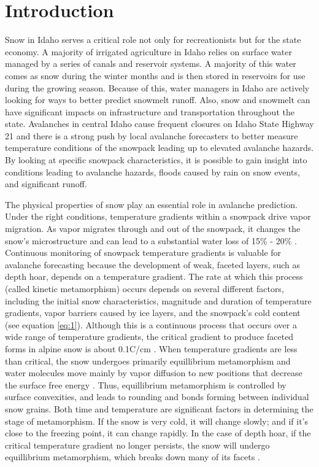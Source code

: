 \chapter{Introduction}
Snow in Idaho serves a critical role not only for recreationists but for the state economy. A majority of irrigated agriculture in Idaho relies on surface water managed by a series of canals and reservoir systems. A majority of this water comes as snow during the winter months and is then stored in reservoirs for use during the growing season. Because of this, water managers in Idaho are actively looking for ways to better predict snowmelt runoff. Also, snow and snowmelt can have significant impacts on infrastructure and transportation throughout the state.  Avalanches in central Idaho cause frequent closures on Idaho State Highway 21 and there is a strong push by local avalanche forecasters to better measure temperature conditions of the snowpack leading up to elevated avalanche hazards. By looking at specific snowpack characteristics, it is possible to gain insight into conditions leading to avalanche hazards, floods caused by rain on snow events, and significant runoff. 

The physical properties of snow play an essential role in avalanche prediction. Under the right conditions, temperature gradients within a snowpack drive vapor migration. As vapor migrates through and out of the snowpack, it changes the snow's microstructure and can lead to a substantial water loss of 15\% - 20\% \citep{hood_williams_cline_1999, marks_dozier_1992, kattelmann_elder_1991}. Continuous monitoring of snowpack temperature gradients is valuable for avalanche forecasting because the development of weak, faceted layers, such as depth hoar, depends on a temperature gradient. The rate at which this process (called kinetic metamorphism) occurs depends on several different factors, including the initial snow characteristics, magnitude and duration of temperature gradients, vapor barriers caused by ice layers, and the snowpack's cold content (see equation \ref{eq:1})\citep{sommerfeld_1970, colbeck1983theory}. Although this is a continuous process that occurs over a wide range of temperature gradients, the critical gradient to produce faceted forms in alpine snow is about 0.1\textdegree C/cm \citep{mcclung_schaerer_2009}. When temperature gradients are less than critical, the snow undergoes primarily equillibrium metamorphism and water molecules move mainly by vapor diffusion to new positions that decrease the surface free energy \citep{sommerfeld_1970}. Thus, equillibrium metamorphism is controlled by surface convexities, and leads to rounding and bonds forming between individual snow grains. Both time and temperature are significant factors in determining the stage of metamorphism. If the snow is very cold, it will change slowly; and if it's close to the freezing point, it can change rapidly. In the case of depth hoar, if the critical temperature gradient no longer persists, the snow will undergo equillibrium metamorphism, which breaks down many of its facets \citep{sommerfeld_1970}.

